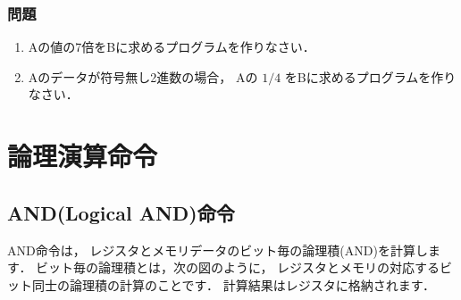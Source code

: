 \vfill
\subsubsection{問題}
\begin{enumerate}
\item Aの値の7倍をBに求めるプログラムを作りなさい．
\item Aのデータが符号無し2進数の場合，
Aの $1/4$ をBに求めるプログラムを作りなさい．
\end{enumerate}
\vfill

\newpage
\section{論理演算命令}

\subsection{AND(Logical AND)命令}
AND命令は，
レジスタとメモリデータのビット毎の論理積(AND)を計算します．
ビット毎の論理積とは，次の図のように，
レジスタとメモリの対応するビット同士の論理積の計算のことです．
計算結果はレジスタに格納されます．

\begin{center}
\epsfxsize=5cm
\end{center}

